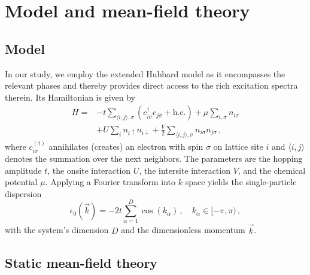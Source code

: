 \documentclass[
    reprint, 
    aps,
    preprintnumbers,
    twocolumn,
    prb,
    superscriptaddress
]{revtex4-2}
\newcommand{\vk}{\vec{k}}
\begin{document}
\section{Model and mean-field theory}\label{sec:model}

\subsection{Model}

In our study, we employ the extended Hubbard model as it encompasses the relevant phases and thereby provides direct access to the rich excitation spectra therein.
Its Hamiltonian is given by
\begin{equation}
    \label{eqn:full_hamiltonian}
    \begin{aligned}
        H = &-t \sum_{\langle i, j \rangle, \sigma} \left( c_{i\sigma}^\dagger c_{j\sigma} + \text{h.c.} \right) 
        + \mu \sum_{i,\sigma} n_{i\sigma} \\
        &+ U \sum_{i} n_{i\uparrow} n_{i\downarrow} 
        + \frac{V}{2} \sum_{\langle i, j\rangle, \sigma} n_{i\sigma} n_{j\sigma}\,,
    \end{aligned}
\end{equation}
where $c_{i\sigma}^{(\dagger)}$ annihilates (creates) an electron with spin $\sigma$ on lattice site $i$ 
and $\langle i, j\rangle$ denotes the summation over the next neighbors.
The parameters are the hopping amplitude $t$, the onsite interaction $U$, the intersite interaction $V$, and the chemical potential $\mu$.
Applying a Fourier transform into $k$ space yields the single-particle dispersion 
\begin{equation}
    \epsilon_0 (\vk) = -2t \sum_{\alpha=1}^D \cos(k_\alpha)\,,\quad k_\alpha \in [-\pi, \pi)\,,
\end{equation}
with the system's dimension $D$ and the dimensionless momentum $\vk$.

\subsection{Static mean-field theory}
\end{document}
